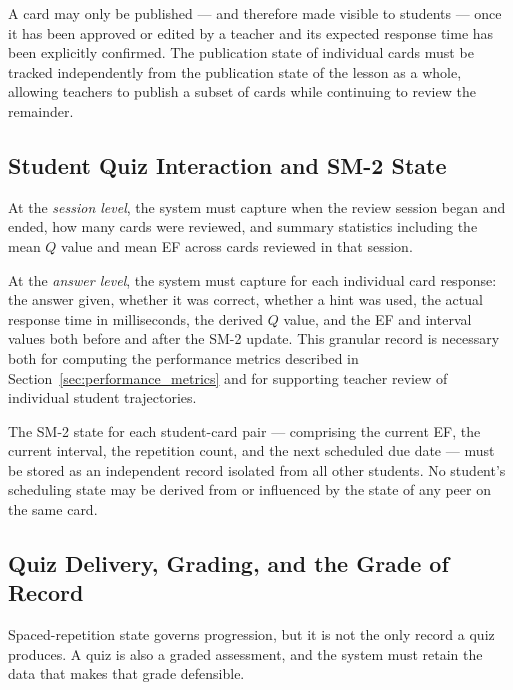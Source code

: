 A card may only be published — and therefore made visible to students 
— once it has been approved or edited by a teacher and its expected 
response time has been explicitly confirmed. The publication state of 
individual cards must be tracked independently from the publication 
state of the lesson as a whole, allowing teachers to publish a subset 
of cards while continuing to review the remainder.

\subsection{Student Quiz Interaction and SM-2 State}

At the \textit{session level}, the system must capture when the review 
session began and ended, how many cards were reviewed, and summary 
statistics including the mean $Q$ value and mean EF across cards 
reviewed in that session.

At the \textit{answer level}, the system must capture for each 
individual card response: the answer given, whether it was correct, 
whether a hint was used, the actual response time in milliseconds, the 
derived $Q$ value, and the EF and interval values both before and 
after the SM-2 update. This granular record is necessary both for 
computing the performance metrics described in 
Section~\ref{sec:performance_metrics} and for supporting teacher 
review of individual student trajectories.

The SM-2 state for each student-card pair — comprising the current EF, 
the current interval, the repetition count, and the next scheduled due 
date — must be stored as an independent record isolated from all other 
students. No student's scheduling state may be derived from or
influenced by the state of any peer on the same card.

\subsection{Quiz Delivery, Grading, and the Grade of Record}

Spaced-repetition state governs progression, but it is not the only
record a quiz produces. A quiz is also a graded assessment, and the
system must retain the data that makes that grade defensible.

